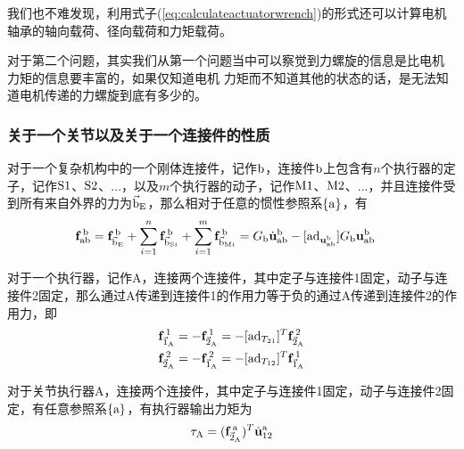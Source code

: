 \documentclass[12pt, a4paper, article, UTF8]{ctexart}
\begin{document}
我们也不难发现，利用式子(\ref{eq:calculateactuatorwrench})的形式还可以计算电机轴承的轴向载荷、径向载荷和力矩载荷。

对于第二个问题，其实我们从第一个问题当中可以察觉到力螺旋的信息是比电机 力矩的信息要丰富的，如果仅知道电机 力矩而不知道其他的状态的话，是无法知道电机传递的力螺旋到底有多少的。

\subsubsection{关于一个关节以及关于一个连接件的性质}
\begin{mytheorem}
对于一个复杂机构中的一个刚体连接件，记作$\textnormal{b}$，连接件$\textnormal{b}$上包含有$n$个执行器的定子，记作$\textnormal{S1}$、$\textnormal{S2}$、...，以及$m$个执行器的动子，记作$\textnormal{M1}$、$\textnormal{M2}$、...，并且连接件受到所有来自外界的力为$\vec{\textnormal{b}}_\textnormal{E}$，那么相对于任意的惯性参照系$\{\textnormal{a}\}$，有
\begin{align*} 	
\mathbf{f}_{\textnormal{ab}}^{\,\textnormal{b}} &= \mathbf{f}^{\,\textnormal{b}}_{\vec{\textnormal{b}}_{\textnormal{E}}} +  \sum^{n}_{i=1} \mathbf{f}^{\,\textnormal{b}}_{\vec{\textnormal{b}}_{\textnormal{S}i}} + \sum^{m}_{i=1} \mathbf{f}^{\,\textnormal{b}}_{\vec{\textnormal{b}}_{\textnormal{M}i}}   = G_{\textnormal{b}} \dot{\mathbf{u}}_{\textnormal{ab}}^{\textnormal{b}} - [\textnormal{ad}_{\mathbf{u}_{\textnormal{ab}}^{\textnormal{b}}}] G_{\textnormal{b}}\mathbf{u}_{\textnormal{ab}}^{\textnormal{b}} 
\end{align*}
\label{th:linkdynamics}
\end{mytheorem}

\begin{mytheorem}
对于一个执行器，记作\textnormal{A}，连接两个连接件，其中定子与连接件1固定，动子与连接件2固定，那么通过\textnormal{A}传递到连接件1的作用力等于负的通过\textnormal{A}传递到连接件2的作用力，即
\begin{align*}
\mathbf{f}_{\vec{1}_{\textnormal{A}}}^{\,1} = -\mathbf{f}_{\vec{2}_{\textnormal{A}}}^{\,1} =- [\textnormal{ad}_{T_{21}}]^T \mathbf{f}_{\vec{2}_{\textnormal{A}}}^{\,2} \\
\mathbf{f}_{\vec{2}_{\textnormal{A}}}^{\,2} = -\mathbf{f}_{\vec{1}_{\textnormal{A}}}^{\,2} =- [\textnormal{ad}_{T_{12}}]^T \mathbf{f}_{\vec{1}_{\textnormal{A}}}^{\,1}
\end{align*}
\end{mytheorem}


\begin{mytheorem}
对于关节执行器A，连接两个连接件，其中定子与连接件1固定，动子与连接件2固定，有任意参照系$\{\textnormal{a}\}$，有执行器输出力矩为
\begin{align*}
\tau_\textnormal{A} = (\mathbf{f}_{\vec{2}_{\textnormal{A}}}^{\,\textnormal{a}})^T \hat{\mathbf{u}}_{12}^{\textnormal{a}}
\end{align*}
\end{mytheorem}
\end{document}
